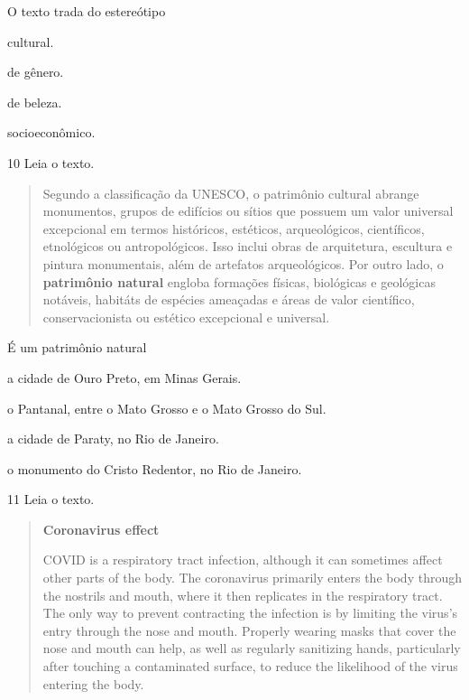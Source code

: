 O texto trada do estereótipo

\begin{escolha}
\item
  cultural.
\item
  de gênero.
\item
  de beleza.
\item
  socioeconômico.
\end{escolha}

\num{10} Leia o texto.

\begin{quote}
Segundo a classificação da UNESCO, o patrimônio cultural abrange monumentos, grupos de edifícios ou sítios 
que possuem um valor universal excepcional em termos históricos, estéticos, arqueológicos, científicos, 
etnológicos ou antropológicos. Isso inclui obras de arquitetura, escultura e pintura monumentais, além de 
artefatos arqueológicos. Por outro lado, o \textbf{patrimônio natural} engloba formações físicas, 
biológicas e geológicas notáveis, habitáts de espécies ameaçadas e áreas de valor científico, 
conservacionista ou estético excepcional e universal.

\end{quote}

É um patrimônio natural

\begin{escolha}
  \item a cidade de Ouro Preto, em Minas Gerais.
  \item o Pantanal, entre o Mato Grosso e o Mato Grosso do Sul.
  \item a cidade de Paraty, no Rio de Janeiro.
  \item o monumento do Cristo Redentor, no Rio de Janeiro.
\end{escolha}

\num{11} Leia o texto.

\begin{quote}
\textbf{Coronavirus effect}

COVID is a respiratory tract infection, although it can sometimes affect
other parts of the body. The coronavirus primarily enters the body
through the nostrils and mouth, where it then replicates in the
respiratory tract. The only way to prevent contracting the infection is
by limiting the virus's entry through the nose and mouth. Properly
wearing masks that cover the nose and mouth can help, as well as
regularly sanitizing hands, particularly after touching a contaminated
surface, to reduce the likelihood of the virus entering the body.

\end{quote}

